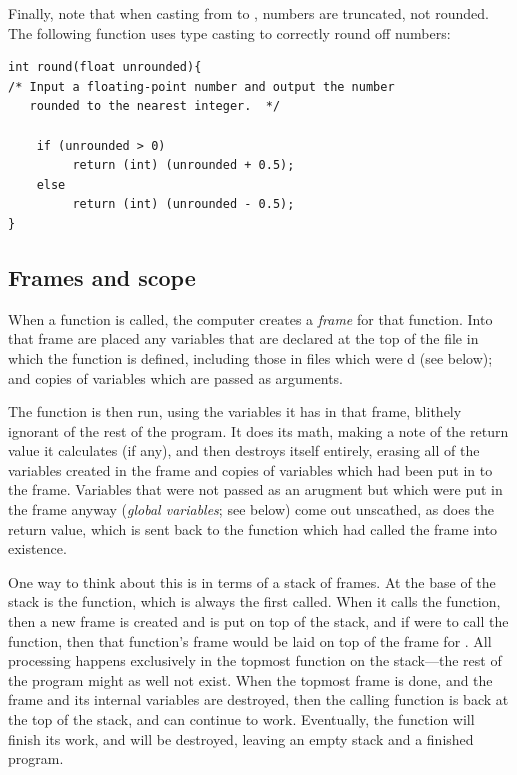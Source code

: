 \documentclass[12pt]{article}
\begin{document}
Finally, note that when casting from  to , numbers
are truncated, not rounded.  The following function uses type casting
to correctly round off numbers:

\begin{lstlisting}
int round(float unrounded){
/* Input a floating-point number and output the number
   rounded to the nearest integer.  */

    if (unrounded > 0)
         return (int) (unrounded + 0.5);
    else
         return (int) (unrounded - 0.5);
}
\end{lstlisting}



\subsection{Frames and scope}  
When a function is called, the computer creates a
{\sl frame} for that function. Into that frame are placed any variables
that are declared at the top of the file in which the function is defined,
including those in files which were d (see below); and copies of
variables which are passed as arguments. 

The function is then run, using the variables it has in that frame,
blithely ignorant of the rest of the program. It does its math, making a
note of the return value it calculates (if any), and then destroys itself
entirely, erasing all of the variables created in the frame and copies
of variables which had been put in to the frame. Variables that were not
passed as an arugment but which were put in the frame anyway ({\sl global
variables}; see below) come out unscathed, as does the return value, which
is sent back to the function which had called the frame into existence.

One way to think about this is in terms of a stack of frames. At the
base of the stack is the  function, which is always the first
called. When it calls the  function, then a new frame
is created and is put on top of the stack, and if 
were to call the  function, then that function's frame would be laid on top
of the frame for . All processing happens exclusively in
the topmost function on the stack---the rest of the program might as
well not exist. When the topmost frame is done, and the frame and its
internal variables are destroyed, then the calling function is back at
the top of the stack, and can continue to work. Eventually, the  function will finish its work, and will be destroyed, leaving an
empty stack and a finished program.
\end{document}
